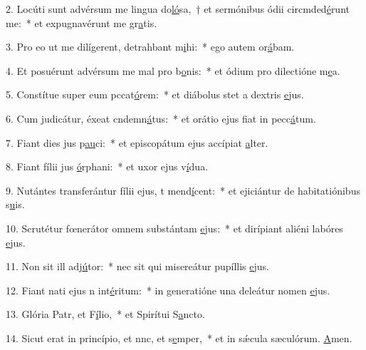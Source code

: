 2. Locúti sunt advérsum me lingua do\uline{ló}sa,~† et sermónibus ódii circmded\uline{é}runt me:~* et expugnavérunt me gr\uline{a}tis.\par 
3. Pro eo ut me dilígerent, detrahbant m\uline{i}hi:~* ego autem or\uline{á}bam.\par 
4. Et posuérunt advérsum me mal pro b\uline{o}nis:~* et ódium pro dilectióne m\uline{e}a.\par 
5. Constítue super eum pccat\uline{ó}rem:~* et diábolus stet a dextris \uline{e}jus.\par 
6. Cum judicátur, éxeat cndemn\uline{á}tus:~* et orátio ejus fiat in pecc\uline{á}tum.\par 
7. Fiant dies jus p\uline{au}ci:~* et episcopátum ejus accípiat \uline{a}lter.\par 
8. Fiant fílii jus \uline{ó}rphani:~* et uxor ejus v\uline{í}dua.\par 
9. Nutántes transferántur fílii ejus, t mend\uline{í}cent:~* et ejiciántur de habitatiónibus s\uline{u}is.\par 
10. Scrutétur fœnerátor omnem substántam \uline{e}jus:~* et dirípiant aliéni labóres \uline{e}jus.\par 
11. Non sit ill adj\uline{ú}tor:~* nec sit qui misereátur pupíllis \uline{e}jus.\par 
12. Fiant nati ejus n int\uline{é}ritum:~* in generatióne una deleátur nomen \uline{e}jus.\par 
13. Glória Patr, et F\uline{í}lio,~* et Spirítui S\uline{a}ncto.\par 
14. Sicut erat in princípio, et nnc, et s\uline{e}mper,~* et in sǽcula sæculórum. \uline{A}men.\par 
